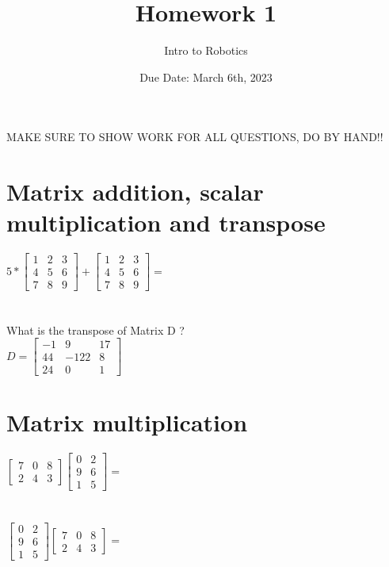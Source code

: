\documentclass{article}
\title{Homework 1}
\author{Intro to Robotics}
\date{Due Date: March 6th, 2023}
\begin{document}
\maketitle
MAKE SURE TO SHOW WORK FOR ALL QUESTIONS, DO BY HAND!!
\section{Matrix addition, scalar multiplication and transpose}
$5*
\begin{bmatrix}
1 & 2 & 3\\
4 & 5 & 6\\
7 & 8 & 9
\end{bmatrix}+
\begin{bmatrix}
1 & 2 & 3\\
4 & 5 & 6\\
7 & 8 & 9
\end{bmatrix} =$\\\\\\

What is the transpose of Matrix D ?\\
$D=
\begin{bmatrix}
-1 & 9 & 17\\
44 & -122 & 8 \\
24 & 0 & 1
\end{bmatrix}$ 

\section{Matrix multiplication}
$\begin{bmatrix}
7 & 0 & 8\\
2 & 4 & 3
\end{bmatrix}
\begin{bmatrix}
0 & 2 \\
9 & 6 \\
1 & 5
\end{bmatrix} = $\\\\\\

$\begin{bmatrix}
0 & 2 \\
9 & 6 \\
1 & 5
\end{bmatrix}
\begin{bmatrix}
7 & 0 & 8\\
2 & 4 & 3
\end{bmatrix} = $\\\\\\
\end{document}

